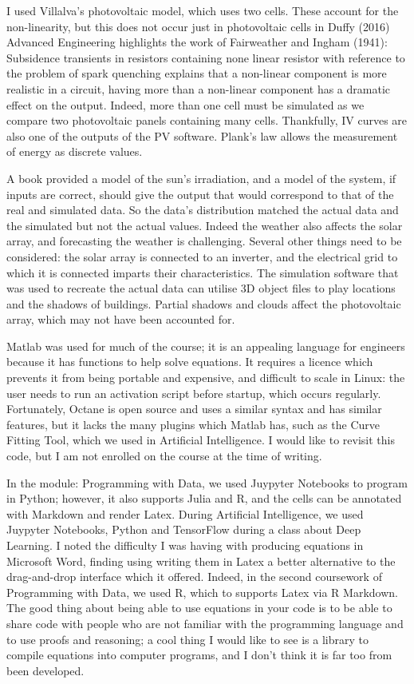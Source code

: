 \documentclass{article}
\begin{document}
I used Villalva's photovoltaic model, which uses two cells. These account for the non-linearity, but this does not occur just in photovoltaic cells in Duffy (2016) Advanced Engineering highlights the work of Fairweather and Ingham (1941): Subsidence transients in resistors containing none linear resistor with reference to the problem of spark quenching explains that a non-linear component is more realistic in a circuit, having more than a non-linear component has a dramatic effect on the output. Indeed, more than one cell must be simulated as we compare two photovoltaic panels containing many cells. Thankfully, IV curves are also one of the outputs of the PV software. Plank's law allows the measurement of energy as discrete values. 

A book provided a model of the sun's irradiation, and a model of the system, if inputs are correct, should give the output that would correspond to that of the real and simulated data. So the data's distribution matched the actual data and the simulated but not the actual values. Indeed the weather also affects the solar array, and forecasting the weather is challenging. Several other things need to be considered: the solar array is connected to an inverter, and the electrical grid to which it is connected imparts their characteristics. The simulation software that was used to recreate the actual data can utilise 3D object files to play locations and the shadows of buildings. Partial shadows and clouds affect the photovoltaic array, which may not have been accounted for. 

Matlab was used for much of the course; it is an appealing language for engineers because it has functions to help solve equations. It requires a licence which prevents it from being portable and expensive, and difficult to scale in Linux: the user needs to run an activation script before startup, which occurs regularly. Fortunately, Octane is open source and uses a similar syntax and has similar features, but it lacks the many plugins which Matlab has, such as the Curve Fitting Tool, which we used in Artificial Intelligence. I would like to revisit this code, but I am not enrolled on the course at the time of writing.

In the module: Programming with Data, we used Juypyter Notebooks to program in Python; however, it also supports Julia and R, and the cells can be annotated with Markdown and render Latex. During Artificial Intelligence, we used Juypyter Notebooks, Python and TensorFlow during a class about Deep Learning. I noted the difficulty I was having with producing equations in Microsoft Word, finding using writing them in Latex a better alternative to the drag-and-drop interface which it offered. Indeed, in the second coursework of Programming with Data, we used  R, which to supports Latex via R Markdown. The good thing about being able to use equations in your code is to be able to share code with people who are not familiar with the programming language and to use proofs and reasoning; a cool thing I would like to see is a library to compile equations into computer programs, and I don't think it is far too from been developed.



 
\end{document}
